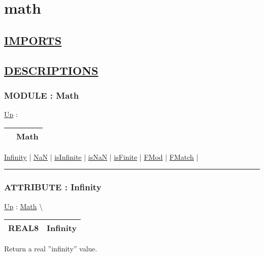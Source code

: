 \chapter*{math}
\hypertarget{ecldoc:toc:math}{}

\section*{\underline{IMPORTS}}

\section*{\underline{DESCRIPTIONS}}
\subsection*{MODULE : Math}
\hypertarget{ecldoc:Math}{}
\hyperlink{ecldoc:toc:root}{Up} :

{\renewcommand{\arraystretch}{1.5}
\begin{tabularx}{\textwidth}{|>{\raggedright\arraybackslash}l|X|}
\hline
\hspace{0pt} & Math \\
\hline
\end{tabularx}
}

\par


\hyperlink{ecldoc:math.infinity}{Infinity}  |
\hyperlink{ecldoc:math.nan}{NaN}  |
\hyperlink{ecldoc:math.isinfinite}{isInfinite}  |
\hyperlink{ecldoc:math.isnan}{isNaN}  |
\hyperlink{ecldoc:math.isfinite}{isFinite}  |
\hyperlink{ecldoc:math.fmod}{FMod}  |
\hyperlink{ecldoc:math.fmatch}{FMatch}  |

\rule{\linewidth}{0.5pt}

\subsection*{ATTRIBUTE : Infinity}
\hypertarget{ecldoc:math.infinity}{}
\hyperlink{ecldoc:Math}{Up} :
\hspace{0pt} \hyperlink{ecldoc:Math}{Math} \textbackslash 

{\renewcommand{\arraystretch}{1.5}
\begin{tabularx}{\textwidth}{|>{\raggedright\arraybackslash}l|X|}
\hline
\hspace{0pt}REAL8 & Infinity \\
\hline
\end{tabularx}
}

\par
Return a real ''infinity'' value.


